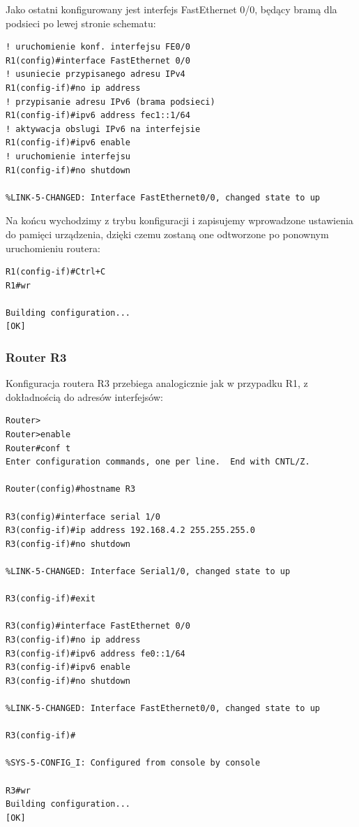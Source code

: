 \documentclass[polish,11pt,a4paper,twoside]{article}
\begin{document}
Jako ostatni konfigurowany jest interfejs FastEthernet 0/0, będący bramą dla podsieci po lewej stronie schematu:
\begin{lstlisting}
! uruchomienie konf. interfejsu FE0/0
R1(config)#interface FastEthernet 0/0
! usuniecie przypisanego adresu IPv4 
R1(config-if)#no ip address 
! przypisanie adresu IPv6 (brama podsieci)
R1(config-if)#ipv6 address fec1::1/64 
! aktywacja obslugi IPv6 na interfejsie
R1(config-if)#ipv6 enable 
! uruchomienie interfejsu
R1(config-if)#no shutdown 

%LINK-5-CHANGED: Interface FastEthernet0/0, changed state to up
\end{lstlisting}
Na końcu wychodzimy z trybu konfiguracji i zapisujemy wprowadzone ustawienia do pamięci urządzenia, dzięki czemu zostaną one odtworzone po ponownym uruchomieniu routera:
\begin{lstlisting}
R1(config-if)#Ctrl+C
R1#wr

Building configuration...
[OK]
\end{lstlisting}


\subsubsection{Router R3}
Konfiguracja routera R3 przebiega analogicznie jak w przypadku R1, z dokładnością do adresów interfejsów:
\begin{lstlisting}
Router>
Router>enable
Router#conf t
Enter configuration commands, one per line.  End with CNTL/Z.

Router(config)#hostname R3

R3(config)#interface serial 1/0
R3(config-if)#ip address 192.168.4.2 255.255.255.0
R3(config-if)#no shutdown 

%LINK-5-CHANGED: Interface Serial1/0, changed state to up

R3(config-if)#exit

R3(config)#interface FastEthernet 0/0
R3(config-if)#no ip address 
R3(config-if)#ipv6 address fe0::1/64
R3(config-if)#ipv6 enable
R3(config-if)#no shutdown 

%LINK-5-CHANGED: Interface FastEthernet0/0, changed state to up

R3(config-if)#

%SYS-5-CONFIG_I: Configured from console by console

R3#wr
Building configuration...
[OK]
\end{lstlisting}
\end{document}

